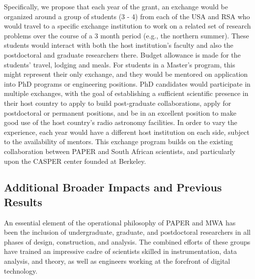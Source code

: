 \documentclass[preprint]{aastex}
\newcommand{\compress}{\vspace{-0.3in}}
\begin{document}
Specifically, we propose that each year of the grant, an exchange would be organized around a group of students (3 - 4) from each of the USA and RSA who would travel to a specific exchange institution to work on a related set of research problems over the course of a 3 month period (e.g., the northern summer).  These students would interact with both the host institution's faculty and also the postdoctoral and graduate researchers there.  Budget allowance is made for the students' travel, lodging and meals.  For students in a Master’s program, this might represent their only exchange, and they would be mentored on application into PhD programs or engineering positions.  PhD candidates would participate in multiple exchanges, with the goal of establishing a sufficient scientific presence in their host country to apply to build post-graduate collaborations, apply for postdoctoral or permanent positions, and be in an excellent position to make good use of the host country's radio astronomy facilities.  In order to vary the experience, each year would have a different host institution on each side, subject to the availability of mentors.  This exchange program builds on the existing collaboration between PAPER and South African scientists, and particularly upon the CASPER center founded at Berkeley.

\compress
\subsection{Additional Broader Impacts and Previous Results}



An essential element of the operational philosophy of PAPER and MWA has been the inclusion of undergraduate, graduate, and postdoctoral researchers in all phases of design, construction, and analysis.  The combined efforts of these groups have trained an impressive cadre of scientists skilled in instrumentation, data analysis, and theory, as well as engineers working at the forefront of digital technology.
\end{document}
